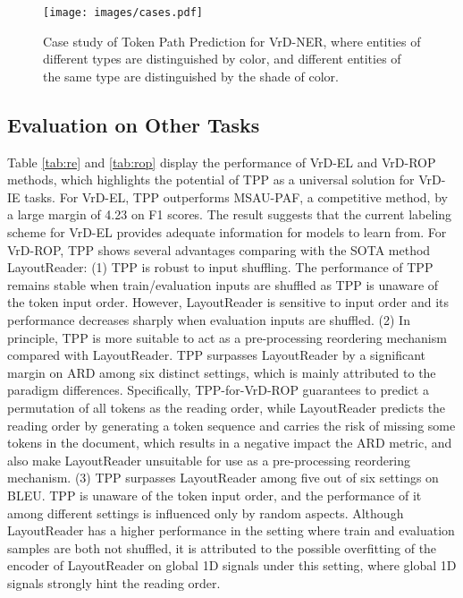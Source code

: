 \documentclass[11pt]{article}
\begin{document}
\begin{figure*}[t]
    \centering
\texttt{[image: images/cases.pdf]}        
    \caption{
        Case study of Token Path Prediction for VrD-NER, where entities of different types are distinguished by color, and different entities of the same type are distinguished by the shade of color. 
        }
\label{fig:cases}
\end{figure*}

\subsection{Evaluation on Other Tasks}

Table \ref{tab:re} and \ref{tab:rop} display the performance of VrD-EL and VrD-ROP methods, which highlights the potential of TPP as a universal solution for VrD-IE tasks.
For VrD-EL, TPP outperforms MSAU-PAF, a competitive method, by a large margin of 4.23 on F1 scores. 
The result suggests that the current labeling scheme for VrD-EL provides adequate information for models to learn from.
For VrD-ROP, TPP shows several advantages comparing with the SOTA method LayoutReader:
(1) TPP is robust to input shuffling. The performance of TPP remains stable when train/evaluation inputs are shuffled as TPP is unaware of the token input order. 
However, LayoutReader is sensitive to input order and its performance decreases sharply when evaluation inputs are shuffled. 
(2) In principle, TPP is more suitable to act as a pre-processing reordering mechanism compared with LayoutReader. 
TPP surpasses LayoutReader by a significant margin on ARD among six distinct settings, which is mainly attributed to the paradigm differences. 
Specifically, TPP-for-VrD-ROP guarantees to predict a permutation of all tokens as the reading order, while LayoutReader predicts the reading order by generating a token sequence and carries the risk of missing some tokens in the document, which results in a negative impact the ARD metric, and also make LayoutReader unsuitable for use as a pre-processing reordering mechanism. 
(3) TPP surpasses LayoutReader among five out of six settings on BLEU. 
TPP is unaware of the token input order, and the performance of it among different settings is influenced only by random aspects. 
Although LayoutReader has a higher performance in the setting where train and evaluation samples are both not shuffled, it is attributed to the possible overfitting of the encoder of LayoutReader on global 1D signals under this setting, where global 1D signals strongly hint the reading order. 
\end{document}
